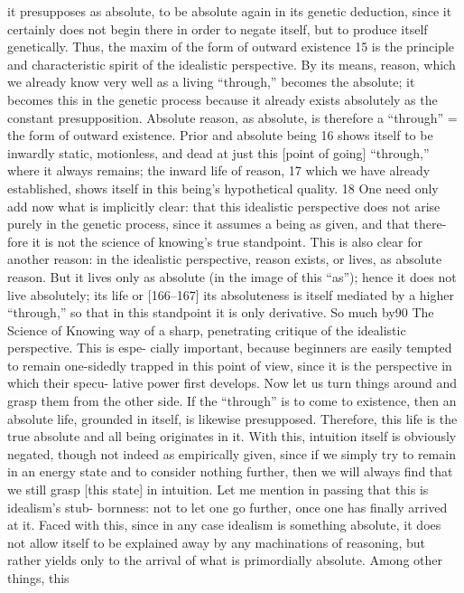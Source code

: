 it presupposes as absolute, to be absolute again in its genetic deduction, since
it certainly does not begin there in order to negate itself, but to produce itself
genetically. Thus, the maxim of the form of outward existence 15 is the principle
and characteristic spirit of the idealistic perspective. By its means, reason,
which we already know very well as a living “through,” becomes the absolute;
it becomes this in the genetic process because it already exists absolutely as the
constant presupposition. Absolute reason, as absolute, is therefore a “through” =
the form of outward existence. Prior and absolute being 16 shows itself to be
inwardly static, motionless, and dead at just this [point of going] “through,”
where it always remains; the inward life of reason, 17 which we have already
established, shows itself in this being’s hypothetical quality. 18 One need only
add now what is implicitly clear: that this idealistic perspective does not arise
purely in the genetic process, since it assumes a being as given, and that there-
fore it is not the science of knowing’s true standpoint. This is also clear for
another reason: in the idealistic perspective, reason exists, or lives, as absolute
reason. But it lives only as absolute (in the image of this “as”); hence it does
not live absolutely; its life or [166–167] its absoluteness is itself mediated by
a higher “through,” so that in this standpoint it is only derivative. So much by90
The Science of Knowing
way of a sharp, penetrating critique of the idealistic perspective. This is espe-
cially important, because beginners are easily tempted to remain one-sidedly
trapped in this point of view, since it is the perspective in which their specu-
lative power first develops.
Now let us turn things around and grasp them from the other side. If
the “through” is to come to existence, then an absolute life, grounded in itself,
is likewise presupposed. Therefore, this life is the true absolute and all being
originates in it. With this, intuition itself is obviously negated, though not
indeed as empirically given, since if we simply try to remain in an energy state
and to consider nothing further, then we will always find that we still grasp
[this state] in intuition. Let me mention in passing that this is idealism’s stub-
bornness: not to let one go further, once one has finally arrived at it. Faced
with this, since in any case idealism is something absolute, it does not allow
itself to be explained away by any machinations of reasoning, but rather yields
only to the arrival of what is primordially absolute. Among other things, this
